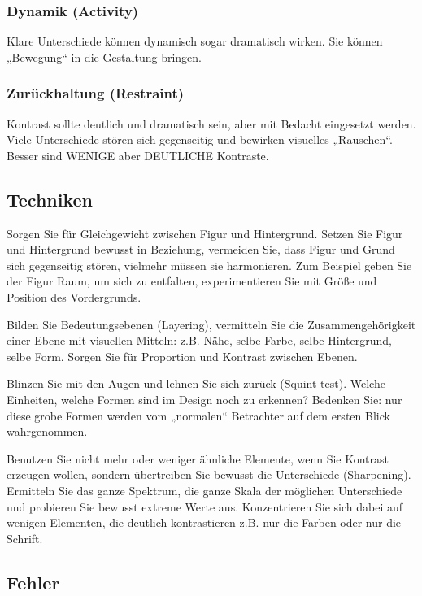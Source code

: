 \subsubsection*{Dynamik (Activity)}
Klare Unterschiede können dynamisch sogar dramatisch wirken. Sie können „Bewegung“ in die Gestaltung bringen.
 
\subsubsection*{Zurückhaltung (Restraint)}
Kontrast sollte deutlich und dramatisch sein, aber mit Bedacht eingesetzt werden. Viele Unterschiede stören sich gegenseitig und bewirken visuelles „Rauschen“. Besser sind WENIGE aber DEUTLICHE Kontraste. 

\subsection{Techniken}
Sorgen Sie für Gleichgewicht zwischen Figur und Hintergrund. Setzen Sie Figur und Hintergrund bewusst in Beziehung, vermeiden Sie, dass Figur und Grund sich gegenseitig stören, vielmehr müssen sie harmonieren. Zum Beispiel geben Sie der Figur Raum, um sich zu entfalten, experimentieren Sie mit Größe und Position des Vordergrunds.
 
Bilden Sie Bedeutungsebenen (Layering), vermitteln Sie die Zusammengehörigkeit einer Ebene mit visuellen Mitteln: z.B. Nähe, selbe Farbe, selbe Hintergrund, selbe Form. Sorgen Sie für Proportion und Kontrast zwischen Ebenen.
 
Blinzen Sie mit den Augen und lehnen Sie sich zurück (Squint test). Welche Einheiten, welche Formen sind im Design noch zu erkennen? Bedenken Sie: nur diese grobe Formen werden vom „normalen“ Betrachter auf dem ersten Blick wahrgenommen.
 
Benutzen Sie nicht mehr oder weniger ähnliche Elemente, wenn Sie Kontrast erzeugen wollen, sondern übertreiben Sie bewusst die Unterschiede (Sharpening). Ermitteln Sie das ganze Spektrum, die ganze Skala der möglichen Unterschiede und probieren Sie bewusst extreme Werte aus. Konzentrieren Sie sich dabei auf wenigen Elementen, die deutlich kontrastieren z.B. nur die Farben oder nur die Schrift.


\subsection{Fehler}

